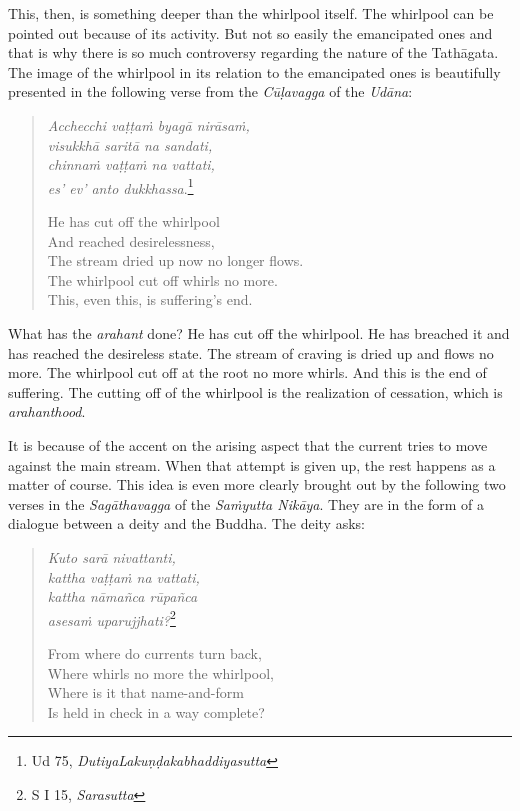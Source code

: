 This, then, is something deeper than the whirlpool itself. The whirlpool can be pointed out because of its activity. But not so easily the emancipated ones and that is why there is so much controversy regarding the nature of the Tathāgata. The image of the whirlpool in its relation to the emancipated ones is beautifully presented in the following verse from the \emph{Cūḷavagga} of the \emph{Udāna}:

\begin{quote}
\emph{Acchecchi vaṭṭaṁ byagā nirāsaṁ,}\\
\emph{visukkhā saritā na sandati,}\\
\emph{chinnaṁ vaṭṭaṁ na vattati,}\\
\emph{es' ev' anto dukkhassa}.\footnote{Ud 75, \emph{DutiyaLakuṇḍakabhaddiyasutta}}

He has cut off the whirlpool\\
And reached desirelessness,\\
The stream dried up now no longer flows.\\
The whirlpool cut off whirls no more.\\
This, even this, is suffering's end.
\end{quote}

What has the \emph{arahant} done? He has cut off the whirlpool. He has breached it and has reached the desireless state. The stream of craving is dried up and flows no more. The whirlpool cut off at the root no more whirls. And this is the end of suffering. The cutting off of the whirlpool is the realization of cessation, which is \emph{arahanthood}.

It is because of the accent on the arising aspect that the current tries to move against the main stream. When that attempt is given up, the rest happens as a matter of course. This idea is even more clearly brought out by the following two verses in the \emph{Sagāthavagga} of the \emph{Saṁyutta Nikāya}. They are in the form of a dialogue between a deity and the Buddha. The deity asks:

\begin{quote}
\emph{Kuto sarā nivattanti,}\\
\emph{kattha vaṭṭaṁ na vattati,}\\
\emph{kattha nāmañca rūpañca}\\
\emph{asesaṁ uparujjhati?}\footnote{S I 15, \emph{Sarasutta}}

From where do currents turn back,\\
Where whirls no more the whirlpool,\\
Where is it that name-and-form\\
Is held in check in a way complete?
\end{quote}

